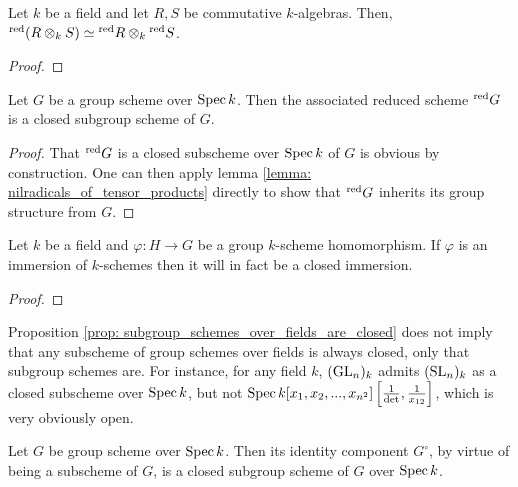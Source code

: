         \begin{lemma} \label{lemma: nilradicals_of_tensor_products}
            Let $k$ be a field and let $R, S$ be commutative $k$-algebras. Then, ${}^{\red}(R \tensor_k S) \cong {}^{\red}R \tensor_k {}^{\red}S$.
        \end{lemma}
            \begin{proof}
                
            \end{proof}
        \begin{proposition} \label{prop: associated_reduced_group_scheme}
            Let $G$ be a group scheme over $\operatorname{Spec} k$. Then the associated reduced scheme ${}^{\mathrm{red}}G$ is a closed subgroup scheme of $G$.
        \end{proposition}
            \begin{proof}
                That ${}^{\mathrm{red}}G$ is a closed subscheme over $\operatorname{Spec} k$ of $G$ is obvious by construction. One can then apply lemma \ref{lemma: nilradicals_of_tensor_products} directly to show that ${}^{\mathrm{red}}G$ inherits its group structure from $G$.
            \end{proof}
            
        \begin{proposition} \label{prop: subgroup_schemes_over_fields_are_closed}
            Let $k$ be a field and $\varphi: H \to G$ be a group $k$-scheme homomorphism. If $\varphi$ is an immersion of $k$-schemes then it will in fact be a closed immersion.
        \end{proposition}
            \begin{proof}
                
            \end{proof}
        \begin{remark}
            Proposition \ref{prop: subgroup_schemes_over_fields_are_closed} does not imply that any subscheme of group schemes over fields is always closed, only that subgroup schemes are. For instance, for any field $k$, $(\mathrm{GL}_n)_k$ admits $(\mathrm{SL}_n)_k$ as a closed subscheme over $\operatorname{Spec} k$, but not $\operatorname{Spec} k[x_1, x_2, ..., x_{n^2}]\left[\frac{1}{\det}, \frac{1}{x_{12}}\right]$, which is very obviously open.
        \end{remark}
        \begin{corollary}
            Let $G$ be group scheme over $\operatorname{Spec} k$. Then its identity component $G^{\circ}$, by virtue of being a subscheme of $G$, is a closed subgroup scheme of $G$ over $\operatorname{Spec} k$.
        \end{corollary}

